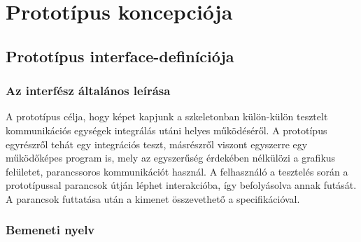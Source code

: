 

\usepackage{enumitem}
\usepackage{textcomp}
\usepackage[utf8]{inputenc}
\usepackage[T1]{fontenc}



\fedlap

\addtocounter{section}{6}
\section{Prototípus koncepciója}

	\subsection{Prototípus interface-definíciója}
	    \subsubsection{Az interfész általános leírása}
	    A prototípus célja, hogy képet kapjunk a szkeletonban külön-külön tesztelt kommunikációs egységek integrálás utáni helyes működéséről. A prototípus egyrészről tehát egy integrációs teszt, másrészről viszont egyszerre egy működőképes program is, mely az egyszerűség érdekében nélkülözi a grafikus felületet, parancssoros kommunikációt használ. A felhasználó a tesztelés során a prototípussal parancsok útján léphet interakcióba, így befolyásolva annak futását. A parancsok futtatása után a kimenet összevethető a specifikációval.
	    
	    \subsubsection{Bemeneti nyelv}
	    
